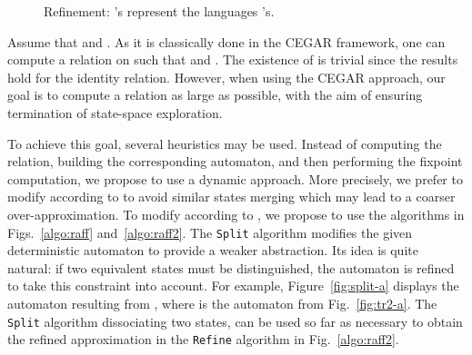 \documentclass[]{llncs}
\begin{document}
\begin{figure}[tb]
{
}
\caption{Refinement: 's represent the languages 
's.}\label{fig-raffinement}
\end{figure}







Assume that  and
. As it is
classically done in the CEGAR framework, one can compute a relation
 on  such that  and . The existence of  is trivial since
the results hold for the identity relation.  However, when using the
CEGAR approach, our goal is to compute a relation  as large as
possible, with the aim of ensuring termination of state-space exploration. 



To achieve this goal, several heuristics may be used.  Instead of
computing the  relation, building the corresponding
 automaton, and then performing the fixpoint
computation, we propose to use a dynamic approach.  More precisely, we
prefer to modify  according to  to avoid similar states
merging which may lead to a coarser over-approximation. To modify 
according to , we propose to use the algorithms in
Figs.~\ref{algo:raff} and~\ref{algo:raff2}. The {\tt Split} algorithm
modifies the given deterministic automaton to provide a weaker
abstraction.  Its idea is quite natural: if two equivalent states must
be distinguished, the automaton  is refined to take this
constraint into account.  For example, Figure~\ref{fig:split-a}
displays the automaton  resulting from
, where  is the automaton
from Fig.~\ref{fig:tr2-a}. The {\tt Split} algorithm dissociating two states, can be used so far
as necessary to obtain the refined approximation in the {\tt Refine}
algorithm in Fig.~\ref{algo:raff2}.
\end{document}
